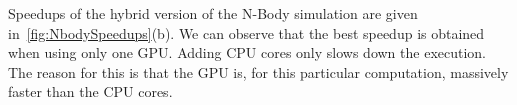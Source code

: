 \documentclass[final]{jfp1}
\makeatletter
\def\thickhrulefill{\leavevmode \leaders \hrule height 0.5pt \hfill \kern \z@}
\newcommand{\hrules}{\vspace{1.5ex}\thickhrulefill}
\newcommand{\hrulee}{\thickhrulefill\vspace{1.5ex}}
\makeatother
\begin{document}
Speedups of the hybrid version of the N-Body simulation are given in~\ref{fig:NbodySpeedups}(b). We can observe that the best speedup is obtained when using
only one GPU. Adding CPU cores only slows down the execution. The reason for 
this is that the GPU is, for this particular computation, massively faster than
the CPU cores. 


\end{document}
